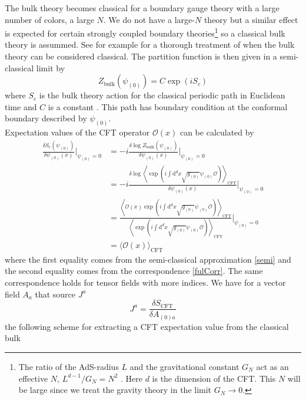 \documentclass[12pt]{report}
\renewcommand{\d}{\ensuremath{\mathrm{d}}}
\renewcommand{\i}{\ensuremath{i}}
\begin{document}
The bulk theory becomes classical for a boundary gauge theory with a large number of colors, a large $N$. We do not have a large-$N$ theory but a similar effect is expected for certain strongly coupled boundary theories\footnote{The ratio of the AdS-radius $L$ and the gravitational constant $G_N$ act as an effective $N$, $L^{d-1}/G_N=N^2$ \cite{McGreevy:2009xe}. Here $d$ is the dimension of the CFT. This $N$ will be large since we treat the gravity theory in the limit $G_N\rightarrow 0$.} so a classical bulk theory is assummed. See for example \cite{McGreevy:2009xe} for a thorough treatment of when the bulk theory can be considered classical. The partition function is then given in a semi-classical limit by
\begin{equation}
 Z_{\mathrm{bulk}}(\psi_{(0)})=C\exp(\i S_c)\label{semi}
\end{equation}
where $S_c$ is the bulk theory action for the classical periodic path in Euclidean time and $C$ is a constant \cite{hartnoll8}. This path has boundary condition at the conformal boundary described by $\psi_{(0)}$.\\
Expectation values of the CFT operator $\mathcal{O}(x)$ can be calculated by
\begin{equation}
\begin{split}
\frac{\delta S_c(\psi_{(0)})}{\delta\psi_{(0)}(x)}|_{\psi_{(0)}=0}&=
-\i\frac{\delta\log Z_{\mathrm{bulk}}(\psi_{(0)})}{\delta\psi_{(0)}(x)}|_{\psi_{(0)}=0}\\
&=-\i\frac{\delta\log\left\langle\exp(\i\int\d^dx\sqrt{g_{(0)}}\psi_{(0)}\mathcal{O})\right\rangle_{\mathrm{CFT}}}{\delta\psi_{(0)}(x)}|_{\psi_{(0)}=0}\\
&=\frac{\left\langle\mathcal{O}(x)\exp(\i\int\d^dx\sqrt{g_{(0)}}\psi_{(0)}\mathcal{O})\right\rangle_{\mathrm{CFT}}}{\left\langle\exp(\i\int\d^dx\sqrt{g_{(0)}}\psi_{(0)}\mathcal{O})\right\rangle_{\mathrm{CFT}}}|_{\psi_{(0)}=0}\\
&=\langle \mathcal{O}(x) \rangle_{\mathrm{CFT}}
\end{split}
\end{equation}
where the first equality comes from the semi-classical approximation \eqref{semi} and the second equality comes from the correspondence \eqref{fulCorr}. The same correspondence holds for tensor fields with more indices. We have for a vector field $A_a$ that source $J^a$
\begin{equation}
J^a= \frac{\delta S_{\mathrm{CFT}}}{\delta A_{(0)a}}
\end{equation}
the following scheme for extracting a CFT expectation value from the classical bulk
\end{document}

